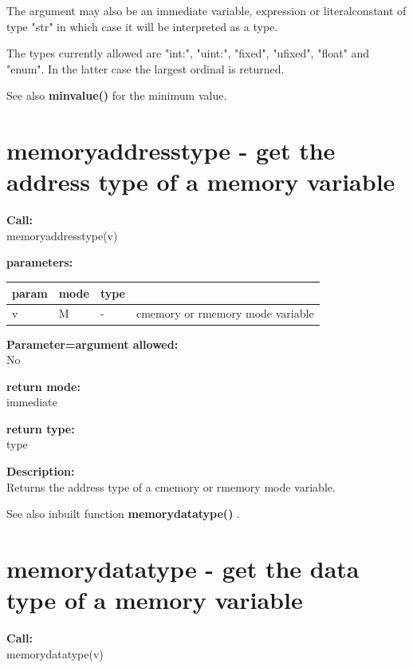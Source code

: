         The argument may also be an immediate variable, expression or
        literalconstant of type "str" in which case it will be interpreted as a
        type.

        The types currently allowed are "int:", "uint:", "fixed", "ufixed",
        "float" and "enum". In the latter case the largest ordinal is returned.
        
        See also {\bf minvalue()}  for the minimum
        value.



    \section{memoryaddresstype - get the address type of a memory variable}\label{sec:ifmemoryaddresstype}
        
        {\bf Call:} \\
        memoryaddresstype(v)
        
        {\bf parameters:} \\
        \begin{tabular}{| l | l | l | l |}
        \hline
        param  & mode & type & \\
        \hline \hline
        v & M & - & cmemory or rmemory mode variable \\ \hline
        \end{tabular}
        
        {\bf Parameter=argument allowed:} \\
        No
        
        {\bf return mode:} \\
        immediate

        {\bf return type:} \\
        type
        
        {\bf Description:} \\
        Returns the address type of a cmemory or rmemory mode variable.

        See also inbuilt function
        {\bf memorydatatype()} .

    \section{memorydatatype - get the data type of a memory variable}\label{sec:ifmemorydatatype}
        
        {\bf Call:} \\
        memorydatatype(v)
        
